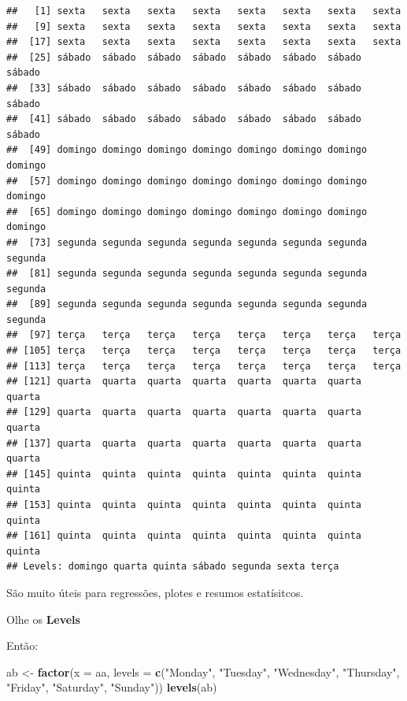 \documentclass[]{book}
\newenvironment{Shaded}{\begin{snugshade}}{\end{snugshade}}
\newcommand{\KeywordTok}[1]{\textcolor[rgb]{0.13,0.29,0.53}{\textbf{#1}}}
\newcommand{\DataTypeTok}[1]{\textcolor[rgb]{0.13,0.29,0.53}{#1}}
\newcommand{\StringTok}[1]{\textcolor[rgb]{0.31,0.60,0.02}{#1}}
\newcommand{\NormalTok}[1]{#1}
\theoremstyle{definition}
\theoremstyle{definition}
\theoremstyle{definition}
\theoremstyle{remark}
\begin{document}
\begin{verbatim}
##   [1] sexta   sexta   sexta   sexta   sexta   sexta   sexta   sexta  
##   [9] sexta   sexta   sexta   sexta   sexta   sexta   sexta   sexta  
##  [17] sexta   sexta   sexta   sexta   sexta   sexta   sexta   sexta  
##  [25] sábado  sábado  sábado  sábado  sábado  sábado  sábado  sábado 
##  [33] sábado  sábado  sábado  sábado  sábado  sábado  sábado  sábado 
##  [41] sábado  sábado  sábado  sábado  sábado  sábado  sábado  sábado 
##  [49] domingo domingo domingo domingo domingo domingo domingo domingo
##  [57] domingo domingo domingo domingo domingo domingo domingo domingo
##  [65] domingo domingo domingo domingo domingo domingo domingo domingo
##  [73] segunda segunda segunda segunda segunda segunda segunda segunda
##  [81] segunda segunda segunda segunda segunda segunda segunda segunda
##  [89] segunda segunda segunda segunda segunda segunda segunda segunda
##  [97] terça   terça   terça   terça   terça   terça   terça   terça  
## [105] terça   terça   terça   terça   terça   terça   terça   terça  
## [113] terça   terça   terça   terça   terça   terça   terça   terça  
## [121] quarta  quarta  quarta  quarta  quarta  quarta  quarta  quarta 
## [129] quarta  quarta  quarta  quarta  quarta  quarta  quarta  quarta 
## [137] quarta  quarta  quarta  quarta  quarta  quarta  quarta  quarta 
## [145] quinta  quinta  quinta  quinta  quinta  quinta  quinta  quinta 
## [153] quinta  quinta  quinta  quinta  quinta  quinta  quinta  quinta 
## [161] quinta  quinta  quinta  quinta  quinta  quinta  quinta  quinta 
## Levels: domingo quarta quinta sábado segunda sexta terça
\end{verbatim}

São muito úteis para regressões, plotes e resumos estatísitcos.

Olhe os \textbf{Levels}

Então:

\begin{Shaded}
\begin{Highlighting}[]
\NormalTok{ab <-}\StringTok{ }\KeywordTok{factor}\NormalTok{(}\DataTypeTok{x =}\NormalTok{ aa,}
             \DataTypeTok{levels =} \KeywordTok{c}\NormalTok{(}\StringTok{"Monday"}\NormalTok{, }\StringTok{"Tuesday"}\NormalTok{,  }\StringTok{"Wednesday"}\NormalTok{,  }\StringTok{"Thursday"}\NormalTok{,}
                        \StringTok{"Friday"}\NormalTok{, }\StringTok{"Saturday"}\NormalTok{, }\StringTok{"Sunday"}\NormalTok{))}
\KeywordTok{levels}\NormalTok{(ab)}
\end{Highlighting}
\end{Shaded}
\end{document}
